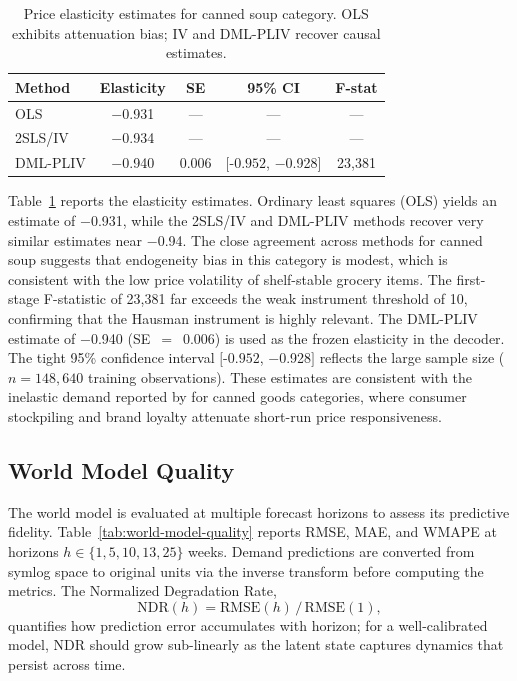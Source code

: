 \begin{table}[t]
\centering
\caption{Price elasticity estimates for canned soup category. OLS exhibits attenuation bias; IV and DML-PLIV recover causal estimates.}
\label{tab:causal-estimation}
\begin{tabular}{@{}lcccc@{}}
\toprule
\textbf{Method} & \textbf{Elasticity} & \textbf{SE} & \textbf{95\% CI} & \textbf{F-stat} \\
\midrule
OLS & $-$0.931 & --- & --- & --- \\
2SLS/IV & $-$0.934 & --- & --- & --- \\
DML-PLIV & $-$0.940 & 0.006 & $[$-$0.952$, $-$0.928$]$ & 23,381 \\
\bottomrule
\end{tabular}
\end{table}

Table~\ref{tab:causal-estimation} reports the elasticity estimates. Ordinary least squares (OLS) yields an estimate of $-$0.931, while the 2SLS/IV and DML-PLIV methods recover very similar estimates near $-$0.94. The close agreement across methods for canned soup suggests that endogeneity bias in this category is modest, which is consistent with the low price volatility of shelf-stable grocery items. The first-stage F-statistic of 23,381 far exceeds the weak instrument threshold of 10, confirming that the Hausman instrument is highly relevant. The DML-PLIV estimate \citep{chernozhukov2018dml} of $-$0.940 (SE~$=$~0.006) is used as the frozen elasticity in the \dreamprice{} decoder. The tight 95\% confidence interval $[$-$0.952$, $-$0.928$]$ reflects the large sample size ($n = 148{,}640$ training observations). These estimates are consistent with the inelastic demand reported by \citet{hoch1995determinants} for canned goods categories, where consumer stockpiling and brand loyalty attenuate short-run price responsiveness.

\subsection{World Model Quality}

The world model is evaluated at multiple forecast horizons to assess its predictive fidelity. Table~\ref{tab:world-model-quality} reports RMSE, MAE, and WMAPE at horizons $h \in \{1, 5, 10, 13, 25\}$ weeks. Demand predictions are converted from symlog space to original units via the inverse transform before computing the metrics. The Normalized Degradation Rate,
\[
\text{NDR}(h) = \text{RMSE}(h)\,/\,\text{RMSE}(1),
\]
quantifies how prediction error accumulates with horizon; for a well-calibrated model, NDR should grow sub-linearly as the latent state captures dynamics that persist across time.

